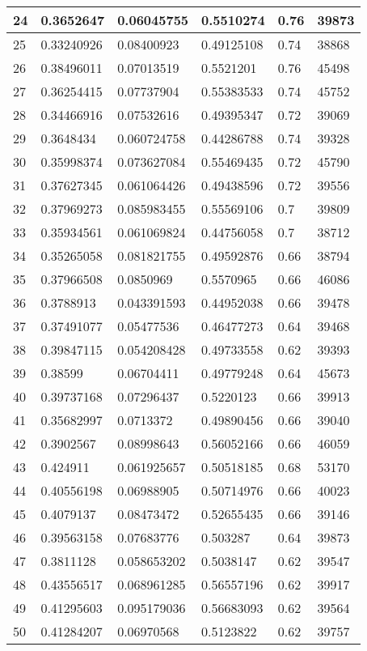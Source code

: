\begin{longtable}{|l|l|l|l|l|l|}
24 & 0.3652647 & 0.06045755 & 0.5510274 & 0.76 & 39873 \\ \hline 
25 & 0.33240926 & 0.08400923 & 0.49125108 & 0.74 & 38868 \\ \hline 
26 & 0.38496011 & 0.07013519 & 0.5521201 & 0.76 & 45498 \\ \hline 
27 & 0.36254415 & 0.07737904 & 0.55383533 & 0.74 & 45752 \\ \hline 
28 & 0.34466916 & 0.07532616 & 0.49395347 & 0.72 & 39069 \\ \hline 
29 & 0.3648434 & 0.060724758 & 0.44286788 & 0.74 & 39328 \\ \hline 
30 & 0.35998374 & 0.073627084 & 0.55469435 & 0.72 & 45790 \\ \hline 
31 & 0.37627345 & 0.061064426 & 0.49438596 & 0.72 & 39556 \\ \hline 
32 & 0.37969273 & 0.085983455 & 0.55569106 & 0.7 & 39809 \\ \hline 
33 & 0.35934561 & 0.061069824 & 0.44756058 & 0.7 & 38712 \\ \hline 
34 & 0.35265058 & 0.081821755 & 0.49592876 & 0.66 & 38794 \\ \hline 
35 & 0.37966508 & 0.0850969 & 0.5570965 & 0.66 & 46086 \\ \hline 
36 & 0.3788913 & 0.043391593 & 0.44952038 & 0.66 & 39478 \\ \hline 
37 & 0.37491077 & 0.05477536 & 0.46477273 & 0.64 & 39468 \\ \hline 
38 & 0.39847115 & 0.054208428 & 0.49733558 & 0.62 & 39393 \\ \hline 
39 & 0.38599 & 0.06704411 & 0.49779248 & 0.64 & 45673 \\ \hline 
40 & 0.39737168 & 0.07296437 & 0.5220123 & 0.66 & 39913 \\ \hline 
41 & 0.35682997 & 0.0713372 & 0.49890456 & 0.66 & 39040 \\ \hline 
42 & 0.3902567 & 0.08998643 & 0.56052166 & 0.66 & 46059 \\ \hline 
43 & 0.424911 & 0.061925657 & 0.50518185 & 0.68 & 53170 \\ \hline 
44 & 0.40556198 & 0.06988905 & 0.50714976 & 0.66 & 40023 \\ \hline 
45 & 0.4079137 & 0.08473472 & 0.52655435 & 0.66 & 39146 \\ \hline 
46 & 0.39563158 & 0.07683776 & 0.503287 & 0.64 & 39873 \\ \hline 
47 & 0.3811128 & 0.058653202 & 0.5038147 & 0.62 & 39547 \\ \hline 
48 & 0.43556517 & 0.068961285 & 0.56557196 & 0.62 & 39917 \\ \hline 
49 & 0.41295603 & 0.095179036 & 0.56683093 & 0.62 & 39564 \\ \hline 
50 & 0.41284207 & 0.06970568 & 0.5123822 & 0.62 & 39757 \\ \hline 
\end{longtable}